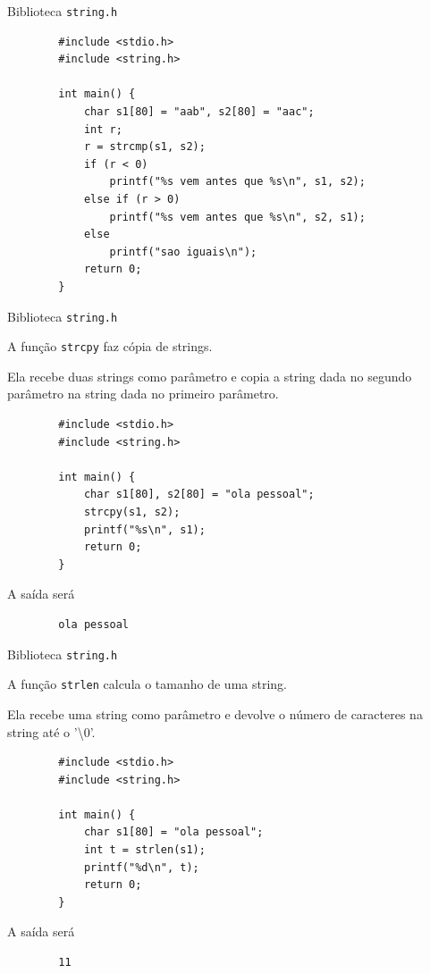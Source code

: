 \documentclass[handout]{beamer}
\newcommand{\cod}[1]{\texttt{#1}}
\begin{document}
\begin{frame}[fragile]{Biblioteca \texttt{string.h}}

    \begin{verbatim}
        #include <stdio.h>
        #include <string.h>

        int main() {
            char s1[80] = "aab", s2[80] = "aac";
            int r;
            r = strcmp(s1, s2);
            if (r < 0)
                printf("%s vem antes que %s\n", s1, s2);
            else if (r > 0)
                printf("%s vem antes que %s\n", s2, s1);
            else
                printf("sao iguais\n");
            return 0;
        }
    \end{verbatim}

\end{frame}

\begin{frame}[fragile]{Biblioteca \texttt{string.h}}

    A função \cod{strcpy} faz cópia de strings.

    Ela recebe duas strings como parâmetro e copia a string dada no segundo parâmetro na string dada no primeiro parâmetro.

    \begin{verbatim}
        #include <stdio.h>
        #include <string.h>

        int main() {
            char s1[80], s2[80] = "ola pessoal";
            strcpy(s1, s2);
            printf("%s\n", s1);
            return 0;
        }
    \end{verbatim}

    A saída será
    \begin{verbatim}
        ola pessoal
    \end{verbatim}

\end{frame}

\begin{frame}[fragile]{Biblioteca \texttt{string.h}}

    A função \cod{strlen} calcula o tamanho de uma string.
    
    Ela recebe uma string como parâmetro e devolve o número de caracteres na string até o '\textbackslash0'.

    \begin{verbatim}
        #include <stdio.h>
        #include <string.h>

        int main() {
            char s1[80] = "ola pessoal";
            int t = strlen(s1);
            printf("%d\n", t);
            return 0;
        }
    \end{verbatim}

    A saída será
    \begin{verbatim}
        11
    \end{verbatim}

\end{frame}
\end{document}
